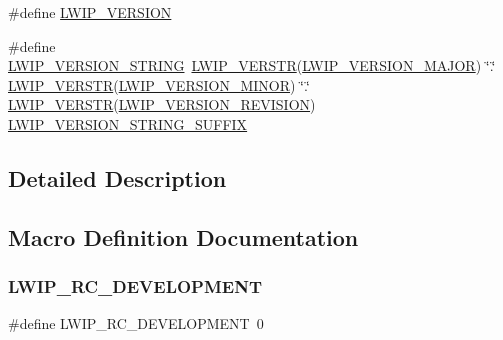 \begin{DoxyCompactItemize}
\item 
\#define \hyperlink{group__lwip__version_ga0a0d322fad0a67aa5b8f1b8c9dfcfe59}{L\+W\+I\+P\+\_\+\+V\+E\+R\+S\+I\+ON}
\item 
\#define \hyperlink{group__lwip__version_gab47e87bc38eef94486db402813183ba7}{L\+W\+I\+P\+\_\+\+V\+E\+R\+S\+I\+O\+N\+\_\+\+S\+T\+R\+I\+NG}~\hyperlink{group__lwip__version_ga6dcc57b1d685cae569b2c9c9461de0e2}{L\+W\+I\+P\+\_\+\+V\+E\+R\+S\+TR}(\hyperlink{group__lwip__version_ga4308c06ef36496e00c798d96d7d03246}{L\+W\+I\+P\+\_\+\+V\+E\+R\+S\+I\+O\+N\+\_\+\+M\+A\+J\+OR}) \char`\"{}.\char`\"{} \hyperlink{group__lwip__version_ga6dcc57b1d685cae569b2c9c9461de0e2}{L\+W\+I\+P\+\_\+\+V\+E\+R\+S\+TR}(\hyperlink{group__lwip__version_ga1e596388c15ba81e753c5633fad1c034}{L\+W\+I\+P\+\_\+\+V\+E\+R\+S\+I\+O\+N\+\_\+\+M\+I\+N\+OR}) \char`\"{}.\char`\"{} \hyperlink{group__lwip__version_ga6dcc57b1d685cae569b2c9c9461de0e2}{L\+W\+I\+P\+\_\+\+V\+E\+R\+S\+TR}(\hyperlink{group__lwip__version_ga0a57983df1b199cf39a2e6a2d90e3d50}{L\+W\+I\+P\+\_\+\+V\+E\+R\+S\+I\+O\+N\+\_\+\+R\+E\+V\+I\+S\+I\+ON}) \hyperlink{group__lwip__version_ga548fd1ff32bddf18074d284b794a3983}{L\+W\+I\+P\+\_\+\+V\+E\+R\+S\+I\+O\+N\+\_\+\+S\+T\+R\+I\+N\+G\+\_\+\+S\+U\+F\+F\+IX}
\end{DoxyCompactItemize}


\subsection{Detailed Description}


\subsection{Macro Definition Documentation}
\mbox{\label{group__lwip__version_ga9ca69b1a453eb72efd0bbda333f2a33b}} 
\subsubsection{\texorpdfstring{L\+W\+I\+P\+\_\+\+R\+C\+\_\+\+D\+E\+V\+E\+L\+O\+P\+M\+E\+NT}{LWIP\_RC\_DEVELOPMENT}\hspace{0.1cm}{\footnotesize\ttfamily [1/2]}}
{\footnotesize\ttfamily \#define L\+W\+I\+P\+\_\+\+R\+C\+\_\+\+D\+E\+V\+E\+L\+O\+P\+M\+E\+NT~0}


